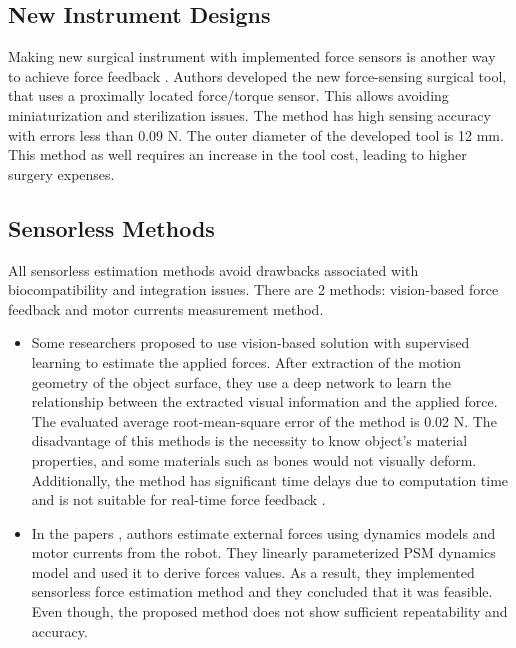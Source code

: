 \subsection{New Instrument Designs}
Making new surgical instrument with implemented force sensors is another way to achieve force feedback \cite{schwalb_forcesensing_2017}. Authors developed the new force-sensing surgical tool, that uses a proximally located force/torque sensor. This allows avoiding miniaturization and sterilization issues. The method has high sensing accuracy with errors less than 0.09 N. The outer diameter of the developed tool is 12 mm. This method as well requires an increase in the tool cost, leading to higher surgery expenses.

\subsection{Sensorless Methods}

All sensorless estimation methods avoid drawbacks associated with biocompatibility and integration issues. There are 2 methods: vision-based force feedback and motor currents measurement method.

\begin{itemize}
\item Some researchers proposed to use vision-based solution with supervised learning to estimate the applied forces. After extraction of the motion geometry of the object surface, they use a deep network to learn the relationship between the extracted visual information and the applied force. The evaluated average root-mean-square error of the method is 0.02 N.  The disadvantage of this methods is the necessity to know object’s material properties, and some materials such as bones would not visually deform. Additionally, the method has significant time delays due to computation time and is not suitable for real-time force feedback \cite{aviles_towards_2017}. 

\item In the papers \cite{sang_hongqiang_external_2017, yoon_design_2015}, authors estimate external forces using dynamics models and motor currents from the robot. They linearly parameterized PSM dynamics model and used it to derive forces values. As a result, they implemented sensorless force estimation method and they concluded that it was feasible. Even though, the proposed method does not show sufficient repeatability and accuracy.
\end{itemize}

